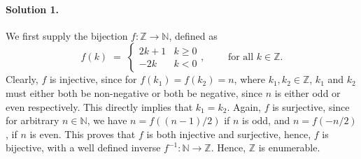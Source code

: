 \documentclass[10pt]{article}
\begin{document}
        \paragraph{Solution 1.}
        We first supply the bijection $f\colon \mathbb{Z} \to \mathbb{N}$, defined as
        \[
        f(k) \;=\; \begin{cases}
                2k + 1          &       k \geq 0 \\
                -2k             &       k < 0
        \end{cases}, \quad\quad\text{ for all } k \in \mathbb{Z}.
        \]
        Clearly, $f$ is injective, since for $f(k_1) = f(k_2) = n$, where $k_1, k_2 \in \mathbb{Z}$, $k_1$ and $k_2$ must either
        both be non-negative or both be negative, since $n$ is either odd or even respectively. This directly implies that $k_1 = k_2$.
        Again, $f$ is surjective, since for arbitrary $n \in \mathbb{N}$, we have $n = f((n - 1) / 2)$ if $n$ is odd, and $n = f(-n / 2)$,
        if $n$ is even. This proves that $f$ is both injective and surjective, hence, $f$ is bijective, with a well defined inverse
        $f^{-1}\colon \mathbb{N}\to \mathbb{Z}$.
        Hence, $\mathbb{Z}$ is enumerable.
\end{document}
